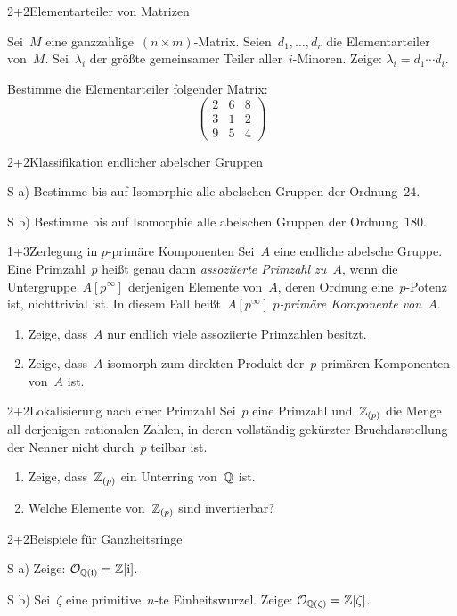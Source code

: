 \documentclass{algblatt}
\begin{document}

\begin{aufgabeE}{2+2}{Elementarteiler von Matrizen}
\item Sei~$M$ eine ganzzahlige~$(n \times m)$-Matrix. Seien~$d_1,\ldots,d_r$
die Elementarteiler von~$M$. Sei~$\lambda_i$ der größte gemeinsamer Teiler
aller~$i$-Minoren. Zeige: $\lambda_i = d_1 \cdots d_i$.
\item Bestimme die Elementarteiler folgender Matrix:
\[ \begin{pmatrix}2 & 6 & 8 \\ 3 & 1 & 2 \\ 9 & 5 & 4\end{pmatrix} \]
\end{aufgabeE}
\vspace{-0.5em}

\begin{aufgabeE}{2+2}{Klassifikation endlicher abelscher Gruppen}
\item[S a)] Bestimme bis auf Isomorphie alle abelschen Gruppen der Ordnung~$24$.
\item[S b)] Bestimme bis auf Isomorphie alle abelschen Gruppen der Ordnung~$180$.
\end{aufgabeE}

\begin{aufgabe}{1+3}{Zerlegung in $p$-primäre Komponenten}
Sei~$A$ eine endliche abelsche Gruppe. Eine Primzahl~$p$ heißt genau dann
\emph{assoziierte Primzahl zu~$A$}, wenn die Untergruppe~$A[p^\infty]$
derjenigen Elemente von~$A$, deren Ordnung eine~$p$-Potenz ist, nichttrivial
ist. In diesem Fall heißt~$A[p^\infty]$ \emph{$p$-primäre Komponente
von~$A$}.
\begin{enumerate}
\item Zeige, dass~$A$ nur endlich viele assoziierte Primzahlen besitzt.
\item Zeige, dass~$A$ isomorph zum direkten Produkt der~$p$-primären
Komponenten von~$A$ ist.
\end{enumerate}
\end{aufgabe}

\begin{aufgabe}{2+2}{Lokalisierung nach einer Primzahl}
Sei~$p$ eine Primzahl und~$\mathbb{Z}_{(p)}$ die Menge all derjenigen rationalen Zahlen,
in deren vollständig gekürzter Bruchdarstellung der Nenner nicht durch~$p$
teilbar ist.
\begin{enumerate}
\item Zeige, dass~$\mathbb{Z}_{(p)}$ ein Unterring von~$\mathbb{Q}$ ist.
\item Welche Elemente von~$\mathbb{Z}_{(p)}$ sind invertierbar?
\end{enumerate}
\end{aufgabe}

\begin{aufgabeE}{2+2}{Beispiele für Ganzheitsringe}
\item[S a)] Zeige: $\mathcal{O}_{\mathbb{Q}(\mathrm{i})} = \mathbb{Z}[\mathrm{i}]$.
\item[S b)] Sei~$\zeta$ eine primitive~$n$-te Einheitswurzel. Zeige:
$\mathcal{O}_{\mathbb{Q}(\zeta)} = \mathbb{Z}[\zeta]$.
\end{aufgabeE}
\end{document}
